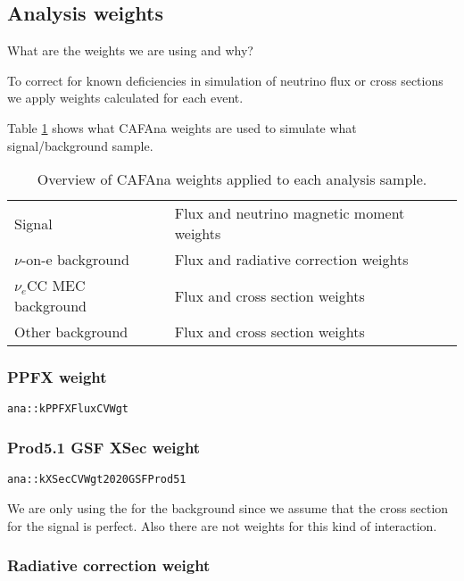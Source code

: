 \subsection{Analysis weights}
What are the weights we are using and why?

To correct for known deficiencies in simulation of neutrino flux or cross sections we apply weights calculated for each event.

Table \ref{tab:WeightsOverview} shows what CAFAna weights are used to simulate what signal/background sample.

\begin{table}[!ht]
\centering
\def\arraystretch{1.4}
\begin{tabular}{l@{\hskip 1in}l}
Signal                   & Flux and neutrino magnetic moment weights\\
$\nu$-on-e background    & Flux and radiative correction weights\\
$\nu_e$CC MEC background & Flux and cross section weights\\
Other background         & Flux and cross section weights
\end{tabular}
\caption{Overview of CAFAna weights applied to each analysis sample.}
\label{tab:WeightsOverview}
\end{table}

\subsubsection*{PPFX weight}
\texttt{ana::kPPFXFluxCVWgt} \cite{NOVA-doc-23441}

\subsubsection*{Prod5.1 GSF XSec weight}
\texttt{ana::kXSecCVWgt2020GSFProd51}


We are only using the for the background since we assume that the cross section for the signal is perfect. Also there are not weights for this kind of interaction.

\subsubsection*{Radiative correction weight}

